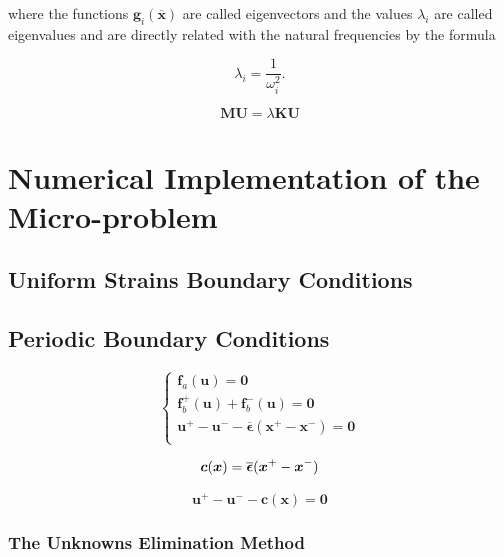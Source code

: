 \documentclass[preprint]{elsarticle}
\begin{document}
\noindent
where the functions $\bm{g}_i(\overline{\bm{x}})$ are called eigenvectors and the
values $\lambda_i$ are called eigenvalues and are directly related with the
natural frequencies by the formula

\begin{equation}
\lambda_i = \frac{1}{\omega_i^2}.
\label{eq:motion}
\end{equation}

\begin{equation}
\bm{M}\bm{U} = \lambda \bm{K}\bm{U}
\label{eq:equil_matricial}
\end{equation}


\section{Numerical Implementation of the Micro-problem}

\subsection{Uniform Strains Boundary Conditions}

\subsection{Periodic Boundary Conditions}

\begin{equation}
\left\{
\begin{array}{ll}
\bm{f}_a(\bm{u}) = \bm{0} \\
\bm{f}_b^+(\bm{u}) + \bm{f}_b^-(\bm{u}) = \bm{0} \\
\bm{u}^+ - \bm{u}^- - \overline{\bm{\epsilon}} ( \bm{x}^+ - \bm{x}^- ) = \bm{0}\\
\end{array}
\right.
\end{equation}

\begin{equation}
\bm{c}(\bm{x}) = \overline{\bm{\epsilon}} ( \bm{x}^+ - \bm{x}^- ) \\
\end{equation}

\begin{equation}
\bm{u}^+ - \bm{u}^- - \bm{c}(\bm{x}) = \bm{0}
\end{equation}

\subsubsection{The Unknowns Elimination Method}
\end{document}
